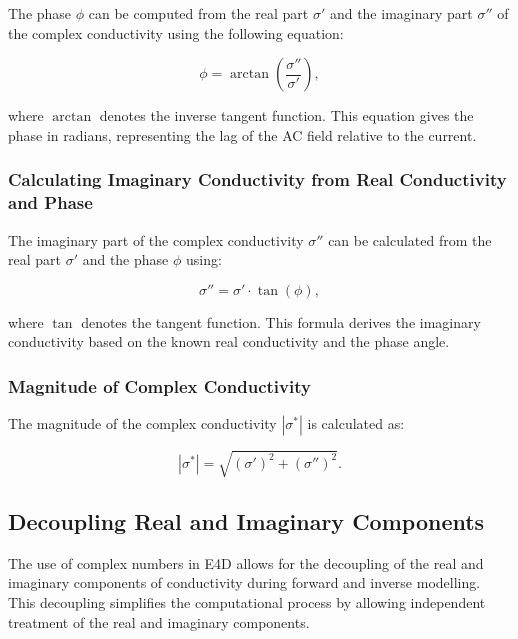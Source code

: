 \documentclass[a4paper,12pt]{article}
\begin{document}
The phase \( \phi \) can be computed from the real part \( \sigma' \) and the
imaginary part \( \sigma'' \) of the complex conductivity using the following
equation:

\begin{equation}
    \phi = \arctan\left(\frac{\sigma''}{\sigma'}\right),
\end{equation}

where \( \arctan \) denotes the inverse tangent function. This equation gives
the phase in radians, representing the lag of the AC field relative to the
current.

\subsubsection{Calculating Imaginary Conductivity from Real Conductivity and Phase}

The imaginary part of the complex conductivity \( \sigma'' \) can be calculated
from the real part \( \sigma' \) and the phase \( \phi \) using:

\begin{equation}
    \sigma'' = \sigma' \cdot \tan(\phi),
\end{equation}

where \( \tan \) denotes the tangent function. This formula derives the
imaginary conductivity based on the known real conductivity and the phase
angle.

\subsubsection{Magnitude of Complex Conductivity}

The magnitude of the complex conductivity \( |\sigma^*| \) is calculated as:

\begin{equation}
    |\sigma^*| = \sqrt{(\sigma')^2 + (\sigma'')^2}.
\end{equation}

\subsection{Decoupling Real and Imaginary Components}

The use of complex numbers in E4D allows for the decoupling of the real and
imaginary components of conductivity during forward and inverse modelling. This
decoupling simplifies the computational process by allowing independent
treatment of the real and imaginary components.
\end{document}
